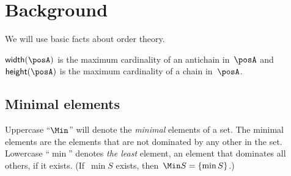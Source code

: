 \section{Background\label{sec:Background}}

We will use basic facts about order theory.





\begin{definition}
\label{def:poset-width-height} $\mathsf{width}(\posA)$ is the maximum
cardinality of an antichain in~$\posA$ and $\mathsf{height}(\posA)$
is the maximum cardinality of a chain in~$\posA$.
\end{definition}


\subsection{Minimal elements}

Uppercase ``$\Min$'' will denote the \emph{minimal} elements of
a set. The minimal elements are the elements that are not dominated
by any other in the set. Lowercase ``$\min$'' denotes\emph{ the
least} element, an element that dominates all others, if it exists.
(If~$\min S$ exists, then~$\Min S=\{\min S\}$.)


